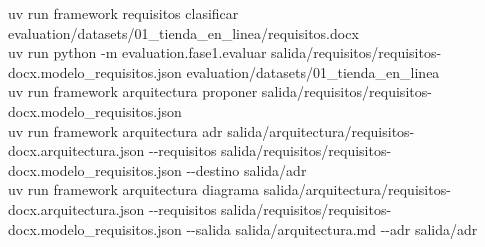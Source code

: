 \documentclass[11pt,a4paper]{report}
\begin{document}
\begin{tcolorbox}[colback=white,colframe=grisfw,boxrule=0.4pt,arc=1mm,left=2mm]
\small\ttfamily
uv run framework requisitos clasificar evaluation/datasets/01\_tienda\_en\_linea/requisitos.docx\\
uv run python -m evaluation.fase1.evaluar salida/requisitos/requisitos-docx.modelo\_requisitos.json evaluation/datasets/01\_tienda\_en\_linea\\
uv run framework arquitectura proponer salida/requisitos/requisitos-docx.modelo\_requisitos.json\\
uv run framework arquitectura adr salida/arquitectura/requisitos-docx.arquitectura.json -{}-requisitos salida/requisitos/requisitos-docx.modelo\_requisitos.json -{}-destino salida/adr\\
uv run framework arquitectura diagrama salida/arquitectura/requisitos-docx.arquitectura.json -{}-requisitos salida/requisitos/requisitos-docx.modelo\_requisitos.json -{}-salida salida/arquitectura.md -{}-adr salida/adr
\end{tcolorbox}
\end{document}
